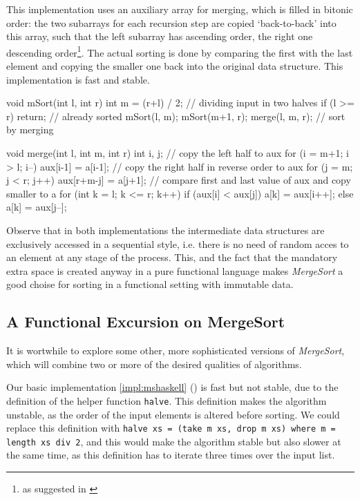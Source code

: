\begin{impl} 
This implementation uses an auxiliary array for merging, which is filled in bitonic order:
the two subarrays for each recursion step are copied `back-to-back' into this array, such that the left subarray has ascending order, the right one descending order\footnote{as suggested in \autocite[chapter 8]{algsc98}}.
The actual sorting is done by comparing the first with the last element and copying the smaller one back into the original data structure. This implementation is fast and stable.
\end{impl}

\begin{javacode}
void mSort(int l, int r) {
    int m = (r+l) / 2; // dividing input in two halves
    if (l >= r) return; // already sorted
    mSort(l, m);
    mSort(m+1, r);
    merge(l, m, r); // sort by merging
}

void merge(int l, int m, int r) {
    int i, j;
    // copy the left half to aux
    for (i = m+1; i > l; i--) aux[i-1] = a[i-1];
    // copy the right half in reverse order to aux
    for (j = m; j < r; j++) aux[r+m-j] = a[j+1];
    // compare first and last value of aux and copy smaller to a
    for (int k = l; k <= r; k++) {
        if (aux[i] < aux[j]) a[k] = aux[i++];
        else a[k] = aux[j--];
    }
}
\end{javacode}

Observe that in both implementations the intermediate data structures are exclusively accessed in a sequential style, i.e. there is no need of random acces to an element at any stage of the process.
This, and the fact that the mandatory extra space is created anyway in a pure functional language makes \emph{MergeSort} a good choise for sorting in a functional setting with immutable data.

\subsection{A Functional Excursion on MergeSort}
It is wortwhile to explore some other, more sophisticated versions of \emph{MergeSort}, which will combine two or more of the desired qualities of algorithms.

Our basic implementation \ref{impl:mshaskell} () is fast but not stable, due to the definition of the helper function \texttt{halve}.
This definition makes the algorithm unstable, as the order of the input elements is altered before sorting.
We could replace this definition with {\texttt{halve xs = (take m xs, drop m xs) where m = length xs div 2}}, and this would make the algorithm stable but also slower at the same time, as this definition has to iterate three times over the input list.


